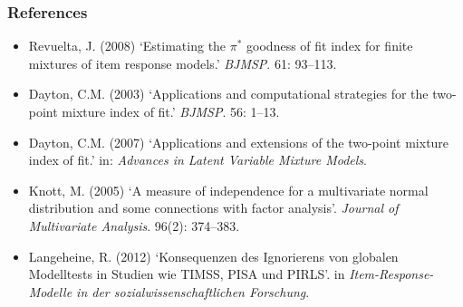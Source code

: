 \documentclass[14pt]{beamer}
\begin{document}
\begin{frame}
	\frametitle{References}
	{\footnotesize
	\begin{itemize}
		\item Revuelta, J. (2008) `Estimating the $\pi^*$ goodness of fit index for finite mixtures of item response models.' {\sl BJMSP}.  61: 93--113.

		\item Dayton, C.M. (2003) `Applications and computational strategies for the two-point mixture index of fit.' {\sl BJMSP}. 56: 1--13.

		\item Dayton, C.M. (2007) `Applications and extensions of the two-point mixture index of fit.' in: {\sl Advances in Latent Variable Mixture Models}.
	
		\item Knott, M. (2005) `A measure of independence for a multivariate
normal distribution and some connections with factor analysis'. {\sl Journal of Multivariate Analysis}. 96(2): 374--383.

		\item Langeheine, R. (2012) `Konsequenzen des Ignorierens von globalen Modelltests in Studien wie TIMSS, PISA und PIRLS'. in {\sl Item-Response-Modelle
in der sozialwissenschaftlichen Forschung}.

	\end{itemize}
	}
\end{frame}
\end{document}
